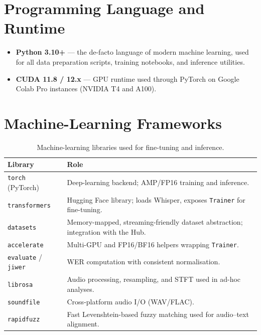 \documentclass[12pt,a4paper]{report}
\begin{document}
\section{Programming Language and Runtime}

\begin{itemize}[leftmargin=2em]
  \item \textbf{Python 3.10+} --- the de-facto language of modern machine
        learning, used for all data preparation scripts, training
        notebooks, and inference utilities.
  \item \textbf{CUDA 11.8 / 12.x} --- GPU runtime used through PyTorch on
        Google Colab Pro instances (NVIDIA T4 and A100).
\end{itemize}

\section{Machine-Learning Frameworks}

\begin{table}[H]
  \centering
  \caption{Machine-learning libraries used for fine-tuning and inference.}
  \label{tab:mt_ml_libs}
  \renewcommand{\arraystretch}{1.3}
  \begin{tabular}{lp{9.5cm}}
    \toprule
    \textbf{Library} & \textbf{Role} \\
    \midrule
    \texttt{torch} (PyTorch)~\cite{paszke2019pytorch} & Deep-learning backend; AMP/FP16 training and inference. \\
    \texttt{transformers}~\cite{wolf2020transformers} & Hugging Face library; loads Whisper, exposes \texttt{Trainer} for fine-tuning. \\
    \texttt{datasets}~\cite{lhoest2021datasets} & Memory-mapped, streaming-friendly dataset abstraction; integration with the Hub. \\
    \texttt{accelerate} & Multi-GPU and FP16/BF16 helpers wrapping \texttt{Trainer}. \\
    \texttt{evaluate} / \texttt{jiwer} & WER computation with consistent normalisation. \\
    \texttt{librosa} & Audio processing, resampling, and STFT used in ad-hoc analyses. \\
    \texttt{soundfile} & Cross-platform audio I/O (WAV/FLAC). \\
    \texttt{rapidfuzz}~\cite{rapidfuzz} & Fast Levenshtein-based fuzzy matching used for audio--text alignment. \\
    \bottomrule
  \end{tabular}
\end{table}
\end{document}
